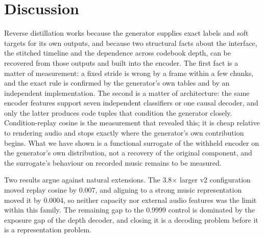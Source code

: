 \section{Discussion}

Reverse distillation works because the generator supplies exact labels and soft targets for its own outputs, and because two structural facts about the interface, the stitched timeline and the dependence across codebook depth, can be recovered from those outputs and built into the encoder. The first fact is a matter of measurement: a fixed stride is wrong by a frame within a few chunks, and the exact rule is confirmed by the generator's own tables and by an independent implementation. The second is a matter of architecture: the same encoder features support seven independent classifiers or one causal decoder, and only the latter produces code tuples that condition the generator closely. Condition-replay cosine is the measurement that revealed this; it is cheap relative to rendering audio and stops exactly where the generator's own contribution begins. What we have shown is a functional surrogate of the withheld encoder on the generator's own distribution, not a recovery of the original component, and the surrogate's behaviour on recorded music remains to be measured.

Two results argue against natural extensions. The 3.8$\times$ larger v2 configuration moved replay cosine by 0.007, and aligning to a strong music representation moved it by 0.0004, so neither capacity nor external audio features was the limit within this family. The remaining gap to the 0.9999 control is dominated by the exposure gap of the depth decoder, and closing it is a decoding problem before it is a representation problem.
